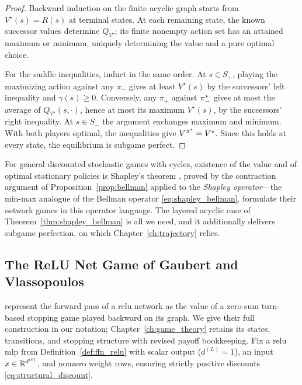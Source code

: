 \begin{proof}
Backward induction on the finite acyclic graph starts from $V^{\star}(s)=R(s)$ at terminal states. At each remaining state, the known successor values determine $Q_{V^{\star}}$; its finite nonempty action set has an attained maximum or minimum, uniquely determining the value and a pure optimal choice.

For the saddle inequalities, induct in the same order. At $s\in S_+$, playing the maximizing action against any $\pi_-$ gives at least $V^{\star}(s)$ by the successors' left inequality and $\gamma(s)\ge0$. Conversely, any $\pi_+$ against $\pi^{\star}_-$ gives at most the average of $Q_{V^{\star}}(s,\cdot)$, hence at most its maximum $V^{\star}(s)$, by the successors' right inequality. At $s\in S_-$ the argument exchanges maximum and minimum. With both players optimal, the inequalities give $V^{\pi^{\star}}=V^{\star}$. Since this holds at every state, the equilibrium is subgame perfect.
\end{proof}

\begin{remark}\label{rem:shapley_history}
For general discounted stochastic games with cycles, existence of the value and of optimal stationary policies is Shapley's theorem \parencite{Shapley1953stochastic}, proved by the contraction argument of Proposition~\ref{prop:bellman} applied to the \emph{Shapley operator}---the min-max analogue of the Bellman operator \eqref{eq:shapley_bellman}. \textcite{Gaubert2025} formulate their network games in this operator language. The layered acyclic case of Theorem~\ref{thm:shapley_bellman} is all we need, and it additionally delivers subgame perfection, on which Chapter~\ref{ch:trajectory} relies.
\end{remark}

\subsection{The ReLU Net Game of Gaubert and Vlassopoulos}\label{subsec:relu_net_game}

\textcite{Gaubert2025} represent the forward pass of a \ac{relu} network as the value of a zero-sum turn-based stopping game played backward on its graph. We give their full construction in our notation; Chapter~\ref{ch:game_theory} retains its states, transitions, and stopping structure with revised payoff bookkeeping. Fix a \ac{relu} \ac{mlp} from Definition~\ref{def:ffn_relu} with scalar output ($d^{(L)}=1$), an input $x\in\mathbb{R}^{d^{(0)}}$, and nonzero weight rows, ensuring strictly positive discounts \eqref{eq:structural_discount}.

